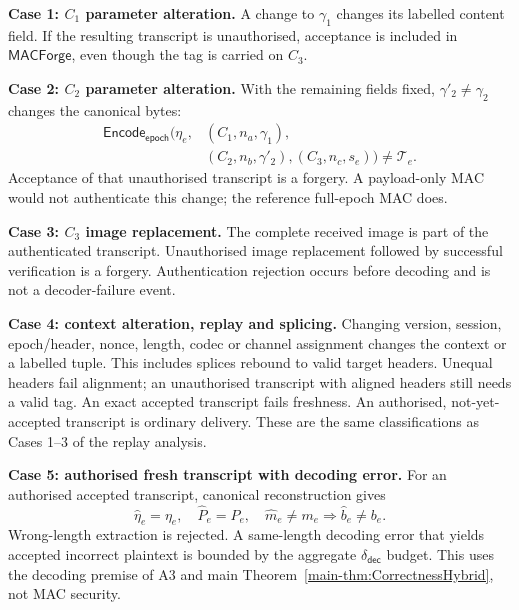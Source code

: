 \documentclass[journal]{IEEEtran}
\theoremstyle{definition}
\theoremstyle{game}
\begin{document}
\textbf{Case 1: $C_1$ parameter alteration.}
A change to $\gamma_1$ changes its labelled content field. If the resulting
transcript is unauthorised, acceptance is included in
$\mathsf{MACForge}$, even though the tag is carried on $C_3$.

\textbf{Case 2: $C_2$ parameter alteration.}
With the remaining fields fixed, $\gamma'_2\ne\gamma_2$ changes the
canonical bytes:
\begin{equation}\label{supp-eq:mitm-c2-transcript-change}
\begin{aligned}
\mathsf{Encode}_{\mathsf{epoch}}\bigl(\eta_e,&(C_1,n_a,\gamma_1),\\
 &(C_2,n_b,\gamma'_2),(C_3,n_c,s_e)\bigr)\ne\mathcal T_e.
\end{aligned}
\end{equation}
Acceptance of that unauthorised transcript is a forgery. A payload-only MAC would not
authenticate this change; the reference full-epoch MAC does.

\textbf{Case 3: $C_3$ image replacement.}
The complete received image is part of the authenticated transcript.
Unauthorised image replacement followed by successful verification is a
forgery. Authentication rejection occurs before decoding and is not a
decoder-failure event.

\textbf{Case 4: context alteration, replay and splicing.}
Changing version, session, epoch/header, nonce, length, codec or channel
assignment changes the context or a labelled tuple. This includes splices
rebound to valid target headers. Unequal headers fail alignment; an
unauthorised transcript with aligned headers still needs a valid tag.
An exact accepted transcript fails freshness. An authorised, not-yet-accepted
transcript is ordinary delivery. These are the same classifications as
Cases 1--3 of the replay analysis.

\textbf{Case 5: authorised fresh transcript with decoding error.}
For an authorised accepted transcript, canonical reconstruction gives
\begin{equation}\label{supp-eq:mitm-reconstruction}
\widehat\eta_e=\eta_e,\quad\widehat P_e=P_e,\quad
\widehat m_e\ne m_e\Longrightarrow\widehat b_e\ne b_e.
\end{equation}
Wrong-length extraction is rejected. A same-length decoding error that
yields accepted incorrect plaintext is bounded by the aggregate
$\delta_{\mathsf{dec}}$ budget. This uses the decoding premise of A3
and main Theorem~\ref{main-thm:CorrectnessHybrid}, not MAC security.
\end{document}
